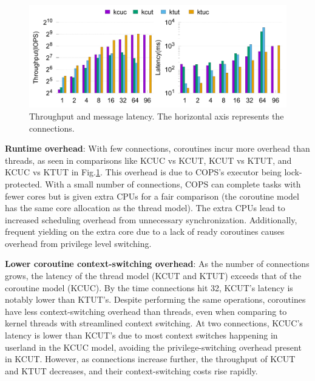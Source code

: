 \documentclass[conference]{IEEEtran}
\begin{document}
\begin{figure}[tbp]
	\centering
  \includegraphics[width=\linewidth]{assets/tl.pdf}
	\caption{Throughput and message latency. The horizontal axis represents the connections.}
	\label{fig:throughput-latency}
  \vspace{-1em}
\end{figure}

\textbf{Runtime overhead}: With few connections, coroutines incur more overhead than threads, as seen in comparisons like KCUC vs KCUT, KCUT vs KTUT, and KCUC vs KTUT in Fig.\ref{fig:throughput-latency}. This overhead is due to COPS's executor being lock-protected. With a small number of connections, COPS can complete tasks with fewer cores but is given extra CPUs for a fair comparison (the coroutine model has the same core allocation as the thread model). The extra CPUs lead to increased scheduling overhead from unnecessary synchronization. Additionally, frequent yielding on the extra core due to a lack of ready coroutines causes overhead from privilege level switching.

\textbf{Lower coroutine context-switching overhead}: As the number of connections grows, the latency of the thread model (KCUT and KTUT) exceeds that of the coroutine model (KCUC). By the time connections hit 32, KCUT's latency is notably lower than KTUT's. Despite performing the same operations, coroutines have less context-switching overhead than threads, even when comparing to kernel threads with streamlined context switching. At two connections, KCUC's latency is lower than KCUT's due to most context switches happening in userland in the KCUC model, avoiding the privilege-switching overhead present in KCUT. However, as connections increase further, the throughput of KCUT and KTUT decreases, and their context-switching costs rise rapidly.
\end{document}
